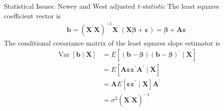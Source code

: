 \documentclass{beamer}
\begin{document}
\begin{frame}{Statistical Issues: Newey and West adjusted \textit{t-statistic}}
	The least squares coefficient vector is
	\begin{align*}
	\mathbf{b}=\left(\mathbf{X}^{\prime} \mathbf{X}\right)^{-1} \mathbf{X}^{\prime}(\mathbf{X} \boldsymbol{\beta}+\boldsymbol{\varepsilon})=\boldsymbol{\beta}+\mathbf{A} \boldsymbol{\varepsilon}	
	\end{align*}
The conditional covariance matrix of the least squares slope estimator is
\begin{align*}
		\operatorname{Var}[\mathbf{b} \mid \mathbf{X}] &=E\left[(\mathbf{b}-\boldsymbol{\beta})(\mathbf{b}-\boldsymbol{\beta})^{\prime} \mid \mathbf{X}\right] \\
		&=E\left[\mathbf{A}\boldsymbol{\varepsilon} \boldsymbol{\varepsilon}^{\prime} \mathbf{A}^{\prime} \mid \mathbf{X}\right] \\
		&=\mathbf{A} E\left[\boldsymbol{\varepsilon} \boldsymbol{\varepsilon}^{\prime} \mid \mathbf{X}\right] \mathbf{A}^{\prime} \\
		&=\sigma^{2}\left(\mathbf{X}^{\prime} \mathbf{X}\right)^{-1} 
\end{align*}
\end{frame}
\end{document}
